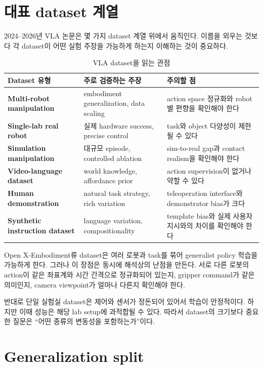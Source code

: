 \section{대표 dataset 계열}

2024--2026년 VLA 논문은 몇 가지 dataset 계열 위에서 움직인다. 이름을 외우는 것보다 각 dataset이 어떤 실험 주장을 가능하게 하는지 이해하는 것이 중요하다.

\begin{table}[t]
  \centering
  \caption{VLA dataset을 읽는 관점}
  \label{tab:vla_dataset_lenses}
  \begin{tabularx}{\textwidth}{>{\bfseries}p{30mm}p{33mm}X}
    \toprule
    Dataset 유형 & 주로 검증하는 주장 & 주의할 점 \\
    \midrule
    Multi-robot manipulation & embodiment generalization, data scaling & action space 정규화와 robot별 편향을 확인해야 한다 \\
    Single-lab real robot & 실제 hardware success, precise control & task와 object 다양성이 제한될 수 있다 \\
    Simulation manipulation & 대규모 episode, controlled ablation & sim-to-real gap과 contact realism을 확인해야 한다 \\
    Video-language dataset & world knowledge, affordance prior & action supervision이 없거나 약할 수 있다 \\
    Human demonstration & natural task strategy, rich variation & teleoperation interface와 demonstrator bias가 크다 \\
    Synthetic instruction dataset & language variation, compositionality & template bias와 실제 사용자 지시와의 차이를 확인해야 한다 \\
    \bottomrule
  \end{tabularx}
\end{table}

Open X-Embodiment류 dataset은 여러 로봇과 task를 묶어 generalist policy 학습을 가능하게 한다. 그러나 이 장점은 동시에 해석상의 난점을 만든다. 서로 다른 로봇의 action이 같은 좌표계와 시간 간격으로 정규화되어 있는지, gripper command가 같은 의미인지, camera viewpoint가 얼마나 다른지 확인해야 한다.

반대로 단일 실험실 dataset은 제어와 센서가 정돈되어 있어서 학습이 안정적이다. 하지만 이때 성능은 해당 lab setup에 과적합될 수 있다. 따라서 dataset의 크기보다 중요한 질문은 ``어떤 종류의 변동성을 포함하는가''이다.

\section{Generalization split}

